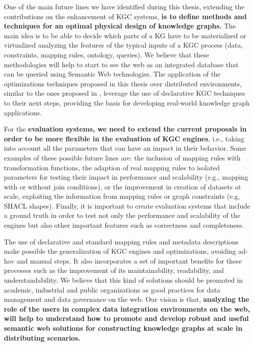 One of the main future lines we have identified during this thesis, extending the contributions on the enhancement of KGC systems, \textbf{is to define methods and techniques for an optimal physical design of knowledge graphs.} The main idea is to be able to decide which parts of a KG have to be materialized or virtualized analyzing the features of the typical inputs of a KGC process (data, constraints, mapping rules, ontology, queries). We believe that these methodologies will help to start to see the web as an integrated database that can be queried using Semantic Web technologies. The application of the optimizations techniques proposed in this thesis over distributed environments, similar to the ones proposed in \citep{endris2019ontario,mami2019squerall}, leverage the use of declarative KGC techniques to their next steps, providing the basis for developing real-world knowledge graph applications.

For the \textbf{evaluation systems, we need to extend the current proposals in order to be more flexible in the evaluation of KGC engines}, i.e., taking into account all the parameters that can have an impact in their behavior. Some examples of these possible future lines are: the inclusion of mapping rules with transformation functions, the adaption of real mapping rules to isolated parameters for testing their impact in performance and scalability (e.g., mapping with or without join conditions), or the improvement in creation of datasets at scale, exploiting the information from mapping rules or graph constraints (e.g, SHACL shapes). Finally, it is important to create evaluation systems that include a ground truth in order to test not only the performance and scalability of the engines but also other important features such as correctness and completeness.

The use of declarative and standard mapping rules and metadata descriptions make possible the generalization of KGC engines and optimizations, avoiding ad-hoc and manual steps. It also incorporates a set of important benefits for these processes such as the improvement of its maintainability, readability, and understandability. We believe that this kind of solutions should be promoted in academic, industrial and public organizations as good practices for data management and data governance on the web. Our vision is that, \textbf{analyzing the role of the users in complex data integration environments on the web, will help to understand how to promote and develop robust and useful semantic web solutions for constructing knowledge graphs at scale in distributing scenarios.}

